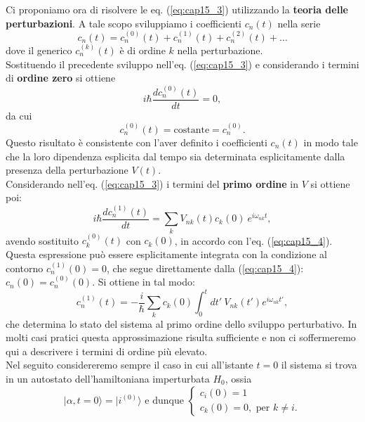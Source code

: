 \documentclass[a4paper,12pt,oneside]{book}
\begin{document}
Ci proponiamo ora di risolvere le eq. (\ref{eq:cap15_3}) utilizzando la \textbf{teoria delle perturbazioni}. A tale scopo sviluppiamo i coefficienti $c_n (t)$ nella serie
\begin{equation}
c_n (t) = c_n ^{(0)}(t)+c_n ^{(1)}(t)+c_n ^{(2)}(t)+\dots
\end{equation}
dove il generico $c_n ^{(k)}(t)$ è di ordine $k$ nella perturbazione.\\
Sostituendo il precedente sviluppo nell'eq. (\ref{eq:cap15_3}) e considerando i termini di \textbf{ordine zero} si ottiene
\begin{equation}
i\hbar \frac{d c_n ^{(0)}(t)}{dt}=0 ,
\end{equation}
da cui
\begin{equation}
c_n ^{(0)}(t) = \textrm{costante}= c_n ^{(0)} .
\label{eq:cap15_4}
\end{equation}
Questo risultato è consistente con l'aver definito i coefficienti $c_n (t)$ in modo tale che la loro dipendenza esplicita dal tempo sia determinata esplicitamente dalla presenza della perturbazione $V(t)$.\\
Considerando nell'eq. (\ref{eq:cap15_3}) i termini del \textbf{primo ordine} in $V$ si ottiene poi:
\begin{equation}
i\hbar \frac{d c_n ^{(1)}(t)}{dt}=\sum _k V_{nk} (t) c_k (0)\ e^{i\omega _{nk} t}  ,
\end{equation}
avendo sostituito $c_k ^{(0)} (t)$ con $c_k (0)$, in accordo con l'eq. (\ref{eq:cap15_4}). Questa espressione può essere esplicitamente integrata con la condizione al contorno $ c_n ^{(1)} (0) =0$, che segue direttamente dalla (\ref{eq:cap15_4}): $c_n (0) = c_n ^{(0)} (0)$. Si ottiene in tal modo:
\begin{equation}
c_n ^{(1)} (t) = -\frac{i}{\hbar} \sum _k c_k (0) \int _0 ^t dt'\ V_{nk} (t') e ^{i \omega _{nk} t'} ,
\label{eq:cap15_5}
\end{equation}
che determina lo stato del sistema al primo ordine dello sviluppo perturbativo. In molti casi pratici questa approssimazione risulta sufficiente e non ci soffermeremo qui a descrivere i termini di ordine più elevato.\\
Nel seguito considereremo sempre il caso in cui all'istante $t=0$ il sistema si trova in un autostato dell'hamiltoniana imperturbata $H_0$, ossia
\begin{equation}
\vert \alpha , t=0\rangle = \vert i ^{(0)} \rangle \textrm{ e dunque } 
 \begin{cases}
   c_i (0)=1\\c_k (0)=0, \textrm{ per }k\neq i.
   \end{cases}
\end{equation}
\end{document}
